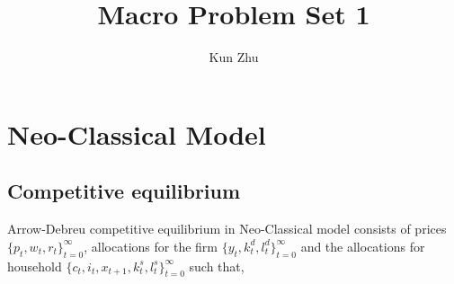 \documentclass[12pt,notitlepage]{article}%
\numberwithin{equation}{section}
\begin{document}
	
	\title{Macro Problem Set 1}
	\author{Kun Zhu}
	
	\maketitle
	
	\section{Neo-Classical Model}
		\subsection{Competitive equilibrium}
			\indent Arrow-Debreu competitive equilibrium in Neo-Classical model consists of prices $\{p_t,w_t,r_t\}_{t=0}^{\infty}$, allocations for the firm $\{y_t,k_t^d,l_t^d\}_{t=0}^{\infty}$ and the allocations for household $\{c_t,i_t,x_{t+1},k_t^s,l_t^s\}_{t=0}^{\infty}$ such that,
\end{document}
